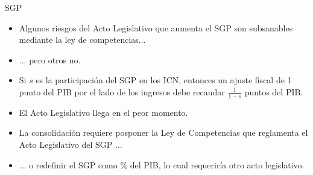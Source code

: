 \begin{frame}{SGP}
\begin{itemize}
    \item Algunos riesgos del Acto Legislativo que aumenta el SGP son subsanables mediante la ley de competencias...
    \item ... pero otros no.
    \item Si $s$ es la participación del SGP en los ICN, entonces un ajuste fiscal de 1 punto del PIB por el lado de los ingresos debe recaudar $\frac{1}{1-s}$ puntos del PIB.
    \item El Acto Legislativo llega en el peor momento.
    \item  La consolidación requiere posponer la Ley de Competencias que reglamenta el Acto Legislativo del SGP ...
    \item ... o redefinir el SGP como \% del PIB, lo cual requeriría otro acto legislativo.
\end{itemize}
\end{frame}

